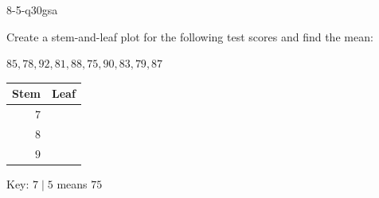 \begin{practiceQuestion}{8-5-q30}{gsa}
\begin{questionText}
Create a stem-and-leaf plot for the following test scores and find the mean:

$85, 78, 92, 81, 88, 75, 90, 83, 79, 87$

\begin{center}
\begin{tabular}{r|l}
\textbf{Stem} & \textbf{Leaf} \\
\hline
$7$ & \\
$8$ & \\
$9$ & \\
\end{tabular}

Key: $7 \mid 5$ means $75$
\end{center}
\end{questionText}
\end{practiceQuestion}
